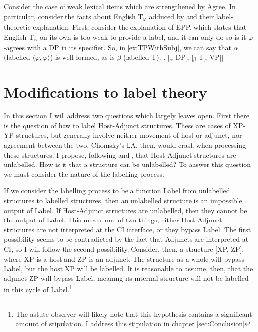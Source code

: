 \documentclass[MilwayThesis]{subfiles}
\begin{document}
Consider the case of weak lexical items which are strengthened by Agree.
In particular, consider the facts about English T$_{\varphi}$ adduced by \textcite{chomsky2015problems} and their label-theoretic explanation.
First, consider the explanation of EPP, which states that English T$_{\varphi}$ on its own is too weak to provide a label, and it can only do so is it $\varphi$-agrees with a DP in its specifier.
So, in \cref{ex:TPWithSubj}, we can say that $\alpha$ (labelled $\langle\varphi,\varphi\rangle$) is well-formed, as is $\beta$ (labelled T).
\ex. [$_{\alpha}$ DP$_{\varphi}$ [$_{\beta}$ T$_{\varphi}$ VP]]\label{ex:TPWithSubj}

\section{Modifications to label theory}\label{sec:modifications}

In this section I will address two questions which \textcite{chomsky2013problems,chomsky2015problems} largely leaves open.
First there is the question of how to label Host-Adjunct structures.
These are cases of XP-YP structures, but generally involve neither movement of host or adjunct, nor agreement between the two.
Chomsky's LA, then, would crash when processing these structures.
I propose, following \textcite{hornstein2009theory} and \textcite{chametzky1996theory}, that Host-Adjunct structures are unlabelled.
How is it that a structure can be unlabelled?
To answer this question we must consider the nature of the labelling process. 

If we consider the labelling process to be a function Label from unlabelled structures to labelled structures, then an unlabelled structure is an impossible output of Label.
If Host-Adjunct structures are unlabelled, then they cannot be the output of Label.
This means one of two things, either Host-Adjunct structures are not interpreted at the CI interface, or they bypass Label.
The first possibility seems to be contradicted by the fact that Adjuncts are interpreted at CI, so I will follow the second possibility.
Consider, then, a structure [XP, ZP], where XP is a host and ZP is an adjunct.
The structure as a whole will bypass Label, but the host XP will be labelled.
It is reasonable to assume, then, that the adjunct ZP will bypass Label, meaning its internal structure will not be labelled in this cycle of Label.\footnote{The astute observer will likely note that this hypothesis contains a significant amount of stipulation.
I address this stipulation in chapter \ref{sec:Conclusion}}
\end{document}
